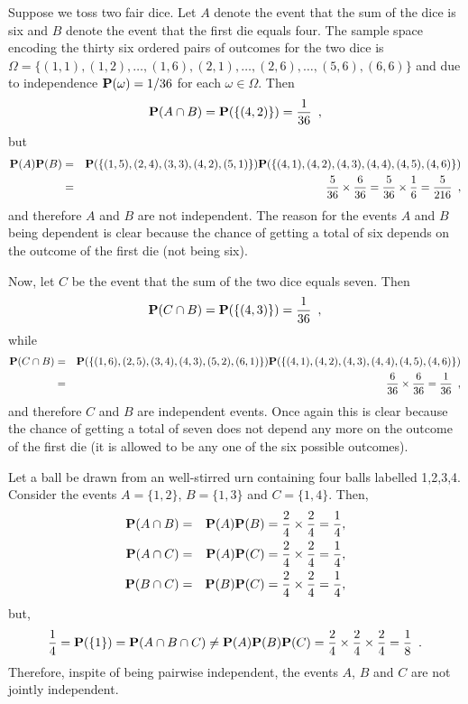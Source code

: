 \begin{example}\label{EX:depAndindep} 
Suppose we toss two fair dice.  
Let $A$ denote the event that the sum of the dice is six and $B$ denote the event that the first die equals four.  The sample space encoding the thirty six ordered pairs of outcomes for the two dice is $\Omega = \{ (1,1), (1,2), \ldots, (1,6), (2,1), \ldots, (2,6), \ldots, (5,6), (6,6)\}$ and due to independence $\mathbf{P}(\omega)=1/36$ for each $\omega\in\Omega$.  
Then 
\[
\mathbf{P}(A \cap B)  = \mathbf{P} (\{(4,2)\}) = \frac{1}{36} \enspace ,
\]
but
\begin{eqnarray*}
\mathbf{P}(A)\mathbf{P}(B) 
&=& \mathbf{P} (\{(1,5),(2,4),(3,3),(4,2),(5,1)\}) \mathbf{P}( \{ (4,1),(4,2),(4,3),(4,4),(4,5),(4,6) \}) \\
&=& \frac{5}{36}\times \frac{6}{36} = \frac{5}{36}\times\frac{1}{6} = \frac{5}{216} \enspace ,
\end{eqnarray*}
and therefore $A$ and $B$ are not independent.  
The reason for the events $A$ and $B$ being dependent is clear because the chance of getting a total of six depends on the outcome of the first die (not being six).

Now, let $C$ be the event that the sum of the two dice equals seven.  
Then
\[
\mathbf{P}(C \cap B)  = \mathbf{P} (\{(4,3)\}) = \frac{1}{36} \enspace ,
\]
while
\begin{eqnarray*}
\mathbf{P}(C \cap B)  
&=& \mathbf{P} (\{(1,6),(2,5),(3,4),(4,3),(5,2),(6,1)\}) \mathbf{P}( \{ (4,1),(4,2),(4,3),(4,4),(4,5),(4,6) \})\\
&=& \frac{6}{36}\times\frac{6}{36}= \frac{1}{36} \enspace ,
\end{eqnarray*}
and therefore $C$ and $B$ are independent events.  Once again this is clear because the chance of getting a total of seven does not depend any more on the outcome of the first die (it is allowed to be any one of the six possible outcomes). 
\end{example}


\begin{example}\label{EX:2indButNotMutind}
Let a ball be drawn from an well-stirred urn containing four balls labelled 1,2,3,4.  
Consider the events $A = \{1,2\}$, $B=\{1,3\}$ and $C=\{1,4\}$.  
Then,
\begin{eqnarray*}
\mathbf{P}(A \cap B) &=& \mathbf{P}(A)\mathbf{P}(B) = \frac{2}{4}\times\frac{2}{4} = \frac{1}{4},\\
\mathbf{P}(A \cap C) &=& \mathbf{P}(A)\mathbf{P}(C) = \frac{2}{4}\times\frac{2}{4} = \frac{1}{4},\\
\mathbf{P}(B \cap C) &=& \mathbf{P}(B)\mathbf{P}(C) = \frac{2}{4}\times\frac{2}{4} = \frac{1}{4},
\end{eqnarray*}
but,
\[
\frac{1}{4} = \mathbf{P}(\{1\}) = \mathbf{P} (A \cap B \cap C) \neq \mathbf{P}(A)\mathbf{P}(B)\mathbf{P}(C) = \frac{2}{4}\times\frac{2}{4}\times\frac{2}{4}=\frac{1}{8} \enspace .
\]
Therefore, inspite of being pairwise independent, the events $A$, $B$ and $C$ are not jointly independent.
\end{example}

